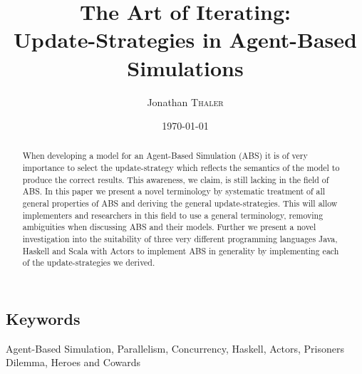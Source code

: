 \documentclass[twocolumn]{article}
\title{The Art of Iterating:\\Update-Strategies in Agent-Based Simulations} %
\author{Jonathan \textsc{Thaler}} %
\date{\today} %
\begin{document}
%
\maketitle %

\begin{abstract}
When developing a model for an Agent-Based Simulation (ABS) it is of very importance to select the update-strategy which reflects the semantics of the model to produce the correct results. This awareness, we claim, is still lacking in the field of ABS. In this paper we present a novel terminology by systematic treatment of all general properties of ABS and deriving the general update-strategies. This will allow implementers and researchers in this field to use a general terminology, removing ambiguities when discussing ABS and their models. Further we present a novel investigation into the suitability of three very different programming languages Java, Haskell and Scala with Actors to implement ABS in generality by implementing each of the update-strategies we derived.
\end{abstract}

\subsection*{Keywords}
Agent-Based Simulation, Parallelism, Concurrency, Haskell, Actors, Prisoners Dilemma, Heroes and Cowards















\newpage



\end{document}
